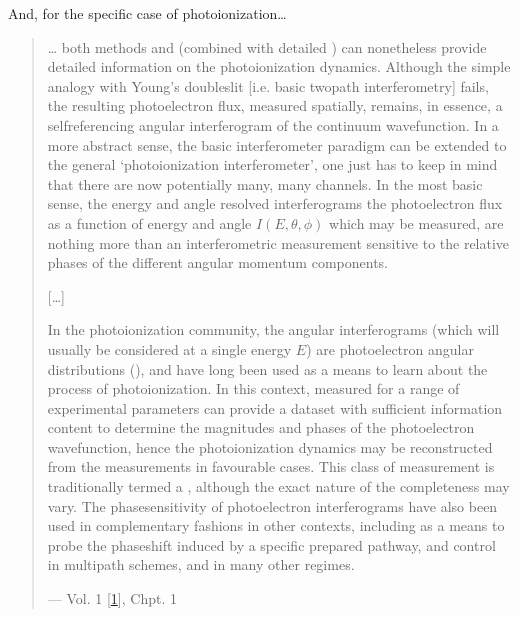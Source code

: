 \documentclass[letterpaper,table,10pt,english]{jupyterBook}
\begin{document}
\sphinxAtStartPar
And, for the specific case of photoionization…
\begin{quote}

\sphinxAtStartPar
… both  methods and  (combined with detailed ) can nonetheless provide detailed information on the photoionization dynamics. Although the simple analogy with Young’s double\sphinxhyphen{}slit {[}i.e. basic two\sphinxhyphen{}path interferometry{]} fails, the resulting photoelectron flux, measured spatially, remains, in essence, a self\sphinxhyphen{}referencing angular interferogram of the continuum wavefunction. In a more abstract sense, the basic interferometer paradigm can be extended to the general ‘photoionization interferometer’, one just has to keep in mind that there are now potentially many, many channels. In the most basic sense, the energy and angle resolved interferograms \sphinxhyphen{} the photoelectron flux as a function of energy and angle \(I(E,\theta,\phi)\) \sphinxhyphen{} which may be measured, are nothing more than an interferometric measurement sensitive to the relative phases of the different angular momentum components.

\sphinxAtStartPar
{[}…{]}

\sphinxAtStartPar
In the photoionization community, the angular interferograms (which will usually be considered at a single energy \(E\)) are photoelectron angular distributions ({\hyperref[\detokenize{backmatter/glossary:term-PADs}]{}}), and have long been used as a means to learn about the process of photoionization. In this context, {\hyperref[\detokenize{backmatter/glossary:term-PADs}]{}} measured for a range of experimental parameters can provide a dataset with sufficient information content to determine the magnitudes and phases of the photoelectron wavefunction, hence the photoionization dynamics may be reconstructed from the measurements in favourable cases. This class of measurement is traditionally termed a , although the exact nature of the completeness may vary. The phase\sphinxhyphen{}sensitivity of photoelectron interferograms have also been used in complementary fashions in other contexts, including as a means to probe the phase\sphinxhyphen{}shift induced by a specific prepared pathway, and control in multipath schemes, and in many other regimes.

\begin{flushright}
--- Vol. 1 {[}\hyperlink{cite.backmatter/bibliography:id569}{1}{]}, Chpt. 1
\end{flushright}
\end{quote}
\end{document}
